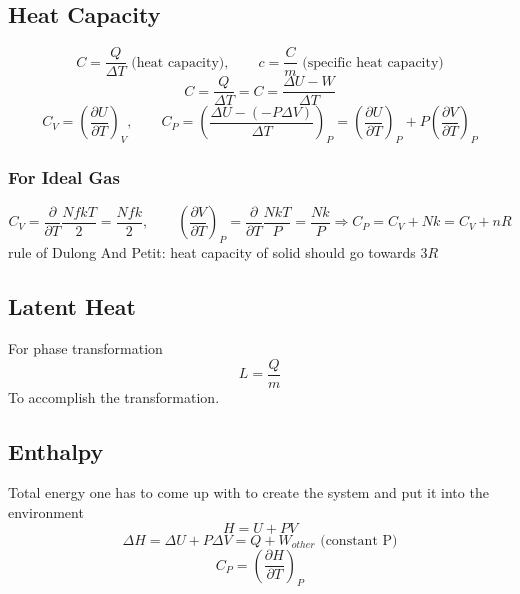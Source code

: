 \documentclass[a4paper,norsk, 10pt]{article}
\begin{document}
\subsection{Heat Capacity}
\begin{equation}
C = \frac{ Q}{\Delta T} \text{ (heat capacity)}, \qquad c = \frac{C}{m} \text{ (specific heat capacity})
\end{equation}
\begin{equation}
C = \frac{ Q}{\Delta T} = C = \frac{\Delta U - W}{\Delta T}
\end{equation}
\begin{equation}
C_V =\left( \frac{\partial U}{\partial T}\right)_V, \qquad C_P = \left(\frac{\Delta U -(-P\Delta V)}{\Delta T}\right)_P = \left( \frac{\partial U}{\partial T}\right)_P + P\left( \frac{\partial V}{\partial T}\right)_P
\end{equation}
\subsubsection{For Ideal Gas}
\begin{equation}
C_V = \frac{\partial}{\partial T }\frac{NfkT}{2} = \frac{Nfk}{2}, \qquad \left(\frac{\partial V}{\partial T}\right)_P = \frac{\partial}{\partial T }\frac{NkT}{P} = \frac{Nk}{P} \Rightarrow C_P = C_V + Nk = C_V + nR
\end{equation}
rule of Dulong And Petit: heat capacity of solid should go towards $3R$
\subsection{Latent Heat}
For phase transformation
\begin{equation}
L = \frac{Q}{m}
\end{equation}
To accomplish the transformation.
\subsection{Enthalpy}
Total energy one has to come up with to create the system and put it into the environment 
\begin{equation}
H = U + PV
\end{equation}
\begin{equation}
\Delta H = \Delta U + P\Delta V = Q +W_{other} \text{ (constant P)}
\end{equation}
\begin{equation}
C_P = \left(\frac{\partial H}{\partial T}\right)_P
\end{equation}
\end{document}
